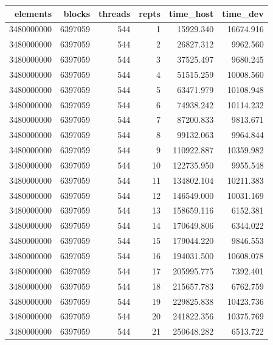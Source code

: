\documentclass{article}
\begin{document}
			\begin{table}[H]
				\begin{adjustbox}{width=\textwidth, keepaspectratio}
					\begin{tabular}{|r|r|r|r|r|r|}
						\hline
						elements & blocks & threads & repts & time\_host & time\_dev \\ \hline
						3480000000 & 6397059 & 544 & 1 & 15929.340 & 16674.916 \\ \hline
						3480000000 & 6397059 & 544 & 2 & 26827.312 & 9962.560 \\ \hline
						3480000000 & 6397059 & 544 & 3 & 37525.497 & 9680.245 \\ \hline
						3480000000 & 6397059 & 544 & 4 & 51515.259 & 10008.560 \\ \hline
						3480000000 & 6397059 & 544 & 5 & 63471.979 & 10108.948 \\ \hline
						3480000000 & 6397059 & 544 & 6 & 74938.242 & 10114.232 \\ \hline
						3480000000 & 6397059 & 544 & 7 & 87200.833 & 9813.671 \\ \hline
						3480000000 & 6397059 & 544 & 8 & 99132.063 & 9964.844 \\ \hline
						3480000000 & 6397059 & 544 & 9 & 110922.887 & 10359.982 \\ \hline
						3480000000 & 6397059 & 544 & 10 & 122735.950 & 9955.548 \\ \hline
						3480000000 & 6397059 & 544 & 11 & 134802.104 & 10211.383 \\ \hline
						3480000000 & 6397059 & 544 & 12 & 146549.000 & 10031.169 \\ \hline
						3480000000 & 6397059 & 544 & 13 & 158659.116 & 6152.381 \\ \hline
						3480000000 & 6397059 & 544 & 14 & 170649.806 & 6344.022 \\ \hline
						3480000000 & 6397059 & 544 & 15 & 179044.220 & 9846.553 \\ \hline
						3480000000 & 6397059 & 544 & 16 & 194031.500 & 10608.078 \\ \hline
						3480000000 & 6397059 & 544 & 17 & 205995.775 & 7392.401 \\ \hline
						3480000000 & 6397059 & 544 & 18 & 215657.783 & 6762.759 \\ \hline
						3480000000 & 6397059 & 544 & 19 & 229825.838 & 10423.736 \\ \hline
						3480000000 & 6397059 & 544 & 20 & 241822.356 & 10375.769 \\ \hline
						3480000000 & 6397059 & 544 & 21 & 250648.282 & 6513.722 \\ \hline

\end{tabular}
\end{adjustbox}
\end{table}
\end{document}
